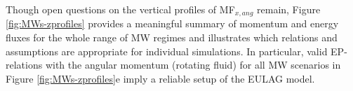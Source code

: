 Though open questions on the vertical profiles of MF$_{x,ang}$ remain, Figure \ref{fig:MWs-zprofiles} provides a meaningful summary of momentum and energy fluxes for the whole range of MW regimes and illustrates which relations and assumptions are appropriate for individual simulations. In particular, valid EP-relations with the angular momentum (rotating fluid) for all MW scenarios in Figure \ref{fig:MWs-zprofiles}e imply a reliable setup of the EULAG model.









